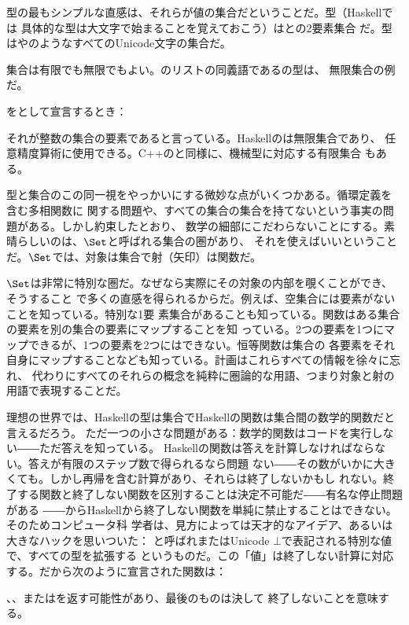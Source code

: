 型の最もシンプルな直感は、それらが値の集合だということだ。型（Haskellでは
具体的な型は大文字で始まることを覚えておこう）はとの2要素集合
だ。型はやのようなすべてのUnicode文字の集合だ。

集合は有限でも無限でもよい。のリストの同義語であるの型は、
無限集合の例だ。

をとして宣言するとき：

それが整数の集合の要素であると言っている。Haskellのは無限集合であり、
任意精度算術に使用できる。C++のと同様に、機械型に対応する有限集合
もある。

型と集合のこの同一視をやっかいにする微妙な点がいくつかある。循環定義を含む多相関数に
関する問題や、すべての集合の集合を持てないという事実の問題がある。しかし約束したとおり、
数学の細部にこだわらないことにする。素晴らしいのは、$\Set$と呼ばれる集合の圏があり、
それを使えばいいということだ。$\Set$では、対象は集合で射（矢印）は関数だ。

$\Set$は非常に特別な圏だ。なぜなら実際にその対象の内部を覗くことができ、そうすること
で多くの直感を得られるからだ。例えば、空集合には要素がないことを知っている。特別な1要
素集合があることも知っている。関数はある集合の要素を別の集合の要素にマップすることを知
っている。2つの要素を1つにマップできるが、1つの要素を2つにはできない。恒等関数は集合の
各要素をそれ自身にマップすることなども知っている。計画はこれらすべての情報を徐々に忘れ、
代わりにすべてのそれらの概念を純粋に圏論的な用語、つまり対象と射の用語で表現することだ。

理想の世界では、Haskellの型は集合でHaskellの関数は集合間の数学的関数だと言えるだろう。
ただ一つの小さな問題がある：数学的関数はコードを実行しない――ただ答えを知っている。
Haskellの関数は答えを計算しなければならない。答えが有限のステップ数で得られるなら問題
ない――その数がいかに大きくても。しかし再帰を含む計算があり、それらは終了しないかもし
れない。終了する関数と終了しない関数を区別することは決定不可能だ――有名な停止問題がある
――からHaskellから終了しない関数を単純に禁止することはできない。そのためコンピュータ科
学者は、見方によっては天才的なアイデア、あるいは大きなハックを思いついた：
と呼ばれ\code{\_|\_}またはUnicode $\bot$で表記される特別な値で、すべての型を拡張する
というものだ。この「値」は終了しない計算に対応する。だから次のように宣言された関数は：

、、または\code{\_|\_}を返す可能性があり、最後のものは決して
終了しないことを意味する。

